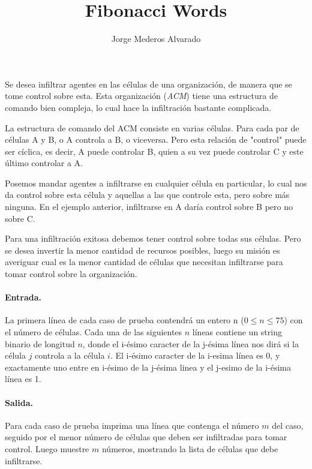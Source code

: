 \documentclass{article}
\begin{document}
\title{\textbf{Fibonacci Words}}
\author{Jorge Mederos Alvarado}
\date{}
												
\maketitle
								
\begin{statement}
	Se desea infiltrar agentes en las células de una organización, de manera que 
	se tome control sobre esta. Esta organización (\emph{ACM}) tiene una 
	estructura de comando bien compleja, lo cual hace la infiltración bastante 
	complicada.
									
	La estructura de comando del ACM consiste en varias células. Para cada par 
	de células A y B, o A controla a B, o viceversa. Pero esta relación de 
	"control" puede ser cíclica, es decir, A puede controlar B, quien a su vez 
	puede controlar C y este último controlar a A.
									
	Posemos mandar agentes a infiltrarse en cualquier célula en particular, lo 
	cual nos da control sobre esta célula y aquellas a las que controle esta, 
	pero sobre más ninguna. En el ejemplo anterior, infiltrarse en A daría 
	control sobre B pero no sobre C.
									
	Para una infiltración exitosa debemos tener control sobre todas sus células. 
	Pero se desea invertir la menor cantidad de recursos posibles, luego su 
	misión es averiguar cual es la menor cantidad de células que necesitan 
	infiltrarse para tomar control sobre la organización.
																						
	\paragraph*{Entrada.} La primera línea de cada caso de prueba contendrá un 
	entero n ($0\le n\le 75$) con el número de células. Cada una de las 
	siguientes $n$ líneas contiene un string binario de longitud $n$, donde el 
	i-ésimo caracter de la j-ésima línea nos dirá si la célula $j$ controla a la 
	célula $i$. El i-ésimo caracter de la i-esima línea es 0, y exactamente uno 
	entre en i-ésimo de la j-ésima linea y el j-esimo de la i-ésima línea es 1.
	
	\paragraph*{Salida.} Para cada caso de prueba imprima una línea que contenga 
	el número $m$ del caso, seguido por el menor número de células que deben ser 
	infiltradas para tomar control. Luego muestre $m$ números, mostrando la 
	lista de células que debe infiltrarse.
																	    

\end{statement}
\end{document}

